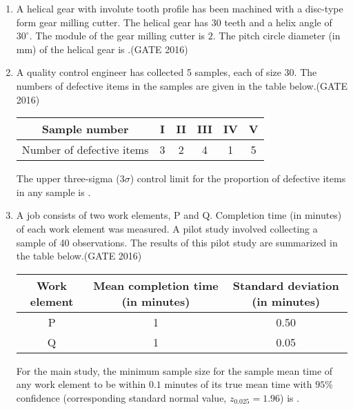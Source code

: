 \documentclass[journal,12pt,onecolumn]{IEEEtran}
\theoremstyle{remark}
\begin{document}
\begin{enumerate}
\item A helical gear with involute tooth profile has been machined with a disc-type form gear milling cutter. The helical gear has $30$ teeth and a helix angle of $30^\circ$. The module of the gear milling cutter is $2$. The pitch circle diameter (in mm) of the helical gear is \underline{\hspace{2cm}}.\hfill{(GATE 2016)}
\vspace{0.5cm}

\item A quality control engineer has collected 5 samples, each of size 30. The numbers of defective items in the samples are given in the table below.\hfill{(GATE 2016)}
\begin{center}
\begin{tabular}{|c|c|c|c|c|c|}
\hline
Sample number & I & II & III & IV & V \\
\hline
Number of defective items & 3 & 2 & 4 & 1 & 5 \\
\hline
\end{tabular}
\end{center}
The upper three-sigma ($3\sigma$) control limit for the proportion of defective items in any sample is \underline{\hspace{2cm}}.
\vspace{0.5cm}
\newpage
\item A job consists of two work elements, P and Q. Completion time (in minutes) of each work element was measured. A pilot study involved collecting a sample of 40 observations. The results of this pilot study are summarized in the table below.\hfill{(GATE 2016)}

\begin{center}
\begin{tabular}{|c|c|c|}
\hline
Work element & Mean completion time (in minutes) & Standard deviation (in minutes) \\
\hline
P & 1 & 0.50 \\
Q & 1 & 0.05 \\
\hline
\end{tabular}
\end{center}

For the main study, the minimum sample size for the sample mean time of any work element to be within $0.1$ minutes of its true mean time with $95\%$ confidence (corresponding standard normal value, $z_{0.025} = 1.96$) is \underline{\hspace{2cm}}.
\vspace{0.5cm}


\end{enumerate}
\end{document}
